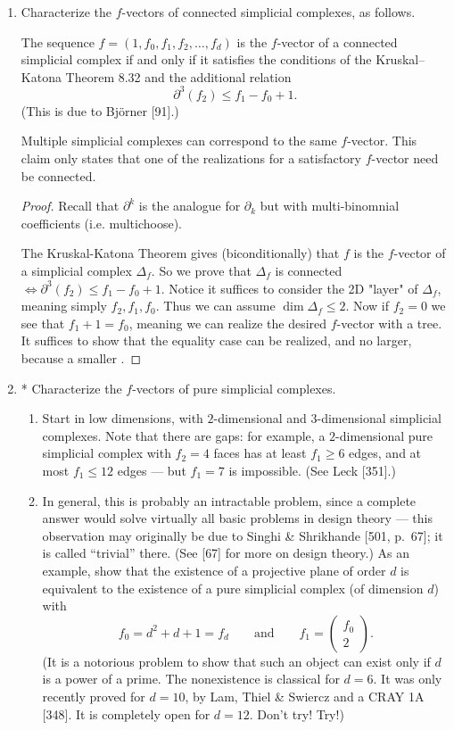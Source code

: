 \documentclass{article}
\begin{document}
\begin{enumerate}
\item Characterize the $f$-vectors of connected simplicial complexes, as follows. 

The sequence $f=(1,f_0,f_1,f_2,\dots,f_d)$ is the $f$-vector of a connected simplicial complex if and only if it satisfies the conditions of the Kruskal--Katona Theorem 8.32 and the additional relation
\[
\partial^3(f_2) \le f_1 - f_0 + 1.
\]
(This is due to Bj\"orner [91].)

\begin{remark}
    Multiple simplicial complexes can correspond to the same $f$-vector. This claim only states that one of the realizations for a satisfactory $f$-vector need be connected.
\end{remark}

\begin{proof}
Recall that $\partial^k$ is the analogue for $\partial_k$ but with multi-binomnial coefficients (i.e. multichoose).

The Kruskal-Katona Theorem gives (biconditionally) that $f$ is the $f$-vector of a simplicial complex $\Delta_f$. So we prove that $\Delta_f$ is connected $\iff \partial^3(f_2) \le f_1 - f_0 + 1$. Notice it suffices to consider the 2D "layer" of $\Delta_f$, meaning simply $f_2, f_1, f_0$. Thus we can assume $\dim \Delta_f \leq 2$. Now if $f_2 = 0$ we see that $f_1 + 1 = f_0$, meaning we can realize the desired $f$-vector with a tree. It suffices to show that the equality case can be realized, and no larger, because a smaller .

\end{proof}

\item* Characterize the $f$-vectors of pure simplicial complexes.
\begin{enumerate}[label=(\roman*)]
\item Start in low dimensions, with $2$-dimensional and $3$-dimensional simplicial complexes. Note that there are gaps: for example, a $2$-dimensional pure simplicial complex with $f_2=4$ faces has at least $f_1\ge 6$ edges, and at most $f_1\le 12$ edges --- but $f_1=7$ is impossible. (See Leck [351].)
\item In general, this is probably an intractable problem, since a complete answer would solve virtually all basic problems in design theory --- this observation may originally be due to Singhi \& Shrikhande [501, p.~67]; it is called ``trivial'' there. (See [67] for more on design theory.) As an example, show that the existence of a projective plane of order $d$ is equivalent to the existence of a pure simplicial complex (of dimension $d$) with
\[
f_0=d^2+d+1=f_d
\qquad\text{and}\qquad
f_1=
\begin{pmatrix}
f_0\\
2
\end{pmatrix}.
\]
(It is a notorious problem to show that such an object can exist only if $d$ is a power of a prime. The nonexistence is classical for $d=6$. It was only recently proved for $d=10$, by Lam, Thiel \& Swiercz and a CRAY 1A [348]. It is completely open for $d=12$. Don't try! Try!)
\end{enumerate}


\end{enumerate}
\end{document}
